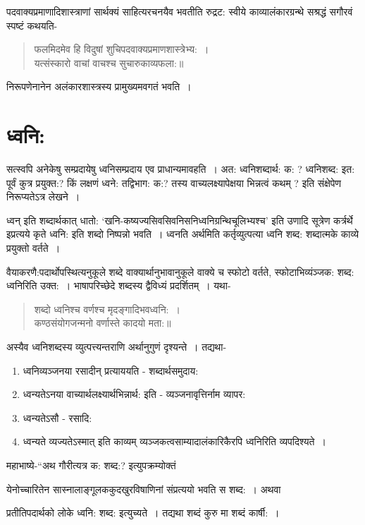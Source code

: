 {पदवाक्यप्रमाणादिशास्त्राणां सार्थक्यं साहित्यरचनयैव भवतीति रुद्रट: स्वीये काव्यालंकारग्रन्थे सश्रद्धं सगौरवं स्पष्टं कथयति-
\begin{verse}
फलमिदमेव हि विदुषां शुचिपदवाक्यप्रमाणशास्त्रेभ्य:~। \\
यत्संस्कारो वाचां वाचश्च सुचारुकाव्यफला:॥
\end{verse}
निरूपणेनानेन अलंकारशास्त्रस्य प्रामुख्यमवगतं भवति~। 

\section*{ध्वनि:}

सत्स्वपि अनेकेषु सम्प्रदायेषु ध्वनिसम्प्रदाय एव प्राधान्यमावहति~। अत: ध्वनिशब्दार्थ: क: ? ध्वनिशब्द: इत: पूर्वं कुत्र प्रयुक्त:? किं लक्षणं ध्वने: तद्विभाग: क:? तस्य वाच्यलक्ष्यापेक्षया भिन्नत्वं कथम् ? इति संक्षेपेण निरूप्यतेऽत्र लेखने~। 

ध्वन् इति शब्दार्थकात् धातो: ‘खनि-कष्यज्यसिवसिवनिसनिध्वनिग्रन्थिचूलिभ्यश्च’ इति उणादि सूत्रेण कर्त्रर्थे इप्रत्यये कृते ध्वनि: इति शब्दो निष्पन्नो भवति~। ध्वनति अर्थमिति कर्तृव्युत्पत्या ध्वनि शब्द: शब्दात्मके काव्ये प्रयुक्तो वर्तते~। 

वैयाकरणै:पदार्थोपस्थित्यनुकूले शब्दे वाक्यार्थानुभावानुकूले वाक्ये च स्फोटो वर्तते, स्फोटाभिव्यंञ्जक: शब्द: ध्वनिरिति उक्त:~। भाषापरिच्छेदे शब्दस्य द्वैविध्यं प्रदर्शितम्~। यथा-
\begin{verse}
शब्दो ध्वनिश्च वर्णश्च मृदङ्गादिभवध्वनि:~। \\
कण्ठसंयोगजन्मनो वर्णास्ते कादयो मता:॥
\end{verse}
अस्यैव ध्वनिशब्दस्य व्युत्पत्त्यन्तराणि अर्थानुगुणं दृश्यन्ते~। तद्यथा-
\begin{enumerate}
\itemsep=0pt
\item ध्वनिव्यञ्जनया रसादीन् प्रत्याययति - शब्दार्थसमुदाय:
\item ध्वन्यतेऽनया वाच्यार्थलक्ष्यार्थभिन्नार्थ: इति - व्यञ्जनावृत्तिर्नाम व्यापर: 
\item ध्वन्यतेऽसौ - रसादि:
\item ध्वन्यते व्यज्यतेऽस्मात् इति काव्यम् व्यञ्जकत्वसाम्यादालंकारिकैरपि ध्वनिरिति व्यपदिश्यते~। 
\end{enumerate}
महाभाष्ये-“अथ गौरीत्यत्र क: शब्द:? इत्युपक्रम्योक्तं 

येनोच्चारितेन सास्नालाङ्गूलककुदखुरविषाणिनां संप्रत्ययो भवति स शब्द:~। अथवा

प्रतीतिपदार्थको लोके ध्वनि: शब्द: इत्युच्यते~। तद्यथा शब्दं कुरु मा शब्दं कार्षी:~।

}
